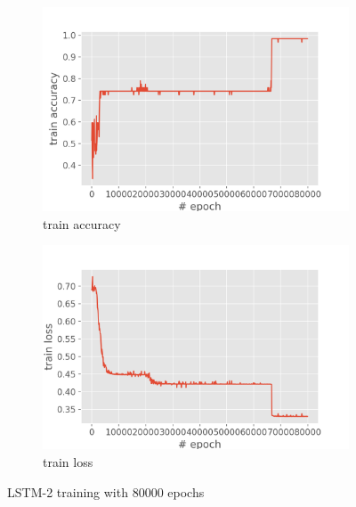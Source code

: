 \documentclass[12pt,article]{article}
\begin{document}
\begin{figure}[H]
\centering
\begin{subfigure}{.5\textwidth}
    \centering
    \includegraphics[scale=0.6]{LSTM-2-80000_parity_train_accuracy.png} \par
    \caption{train accuracy}
\end{subfigure}%
\begin{subfigure}{.5\textwidth}
    \centering
    \includegraphics[scale=0.6]{LSTM-2-80000_parity_train_loss.png} \par
    \caption{train loss}
\end{subfigure}
\caption{LSTM-2 training with 80000 epochs}
\label{fig:lstm2-80000-training}
\end{figure}
\end{document}
